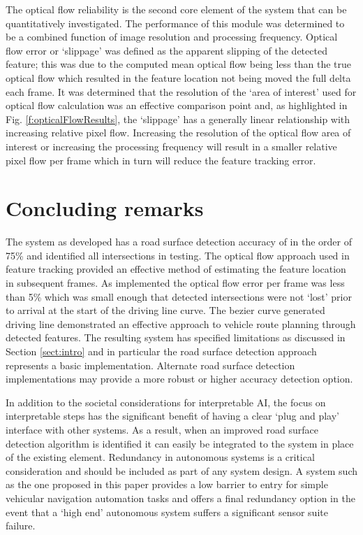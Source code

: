 \documentclass[]{aiaa-tc}%
\begin{document}
The optical flow reliability is the second core element of the system that can be quantitatively investigated. The performance of this module was determined to be a combined function of image resolution and processing frequency. Optical flow error or `slippage' was defined as the apparent slipping of the detected feature; this was due to the computed mean optical flow being less than the true optical flow which resulted in the feature location not being moved the full delta each frame. It was determined that the resolution of the `area of interest' used for optical flow calculation was an effective comparison point and, as highlighted in Fig. \ref{f:opticalFlowResults}, the `slippage' has a generally linear relationship with increasing relative pixel flow. Increasing the resolution of the optical flow area of interest or increasing the processing frequency will result in a smaller relative pixel flow per frame which in turn will reduce the feature tracking error.

\section{Concluding remarks}

The system as developed has a road surface detection accuracy of in the order of 75\% and identified all intersections in testing. The optical flow approach used in feature tracking provided an effective method of estimating the feature location in subsequent frames. As implemented the optical flow error per frame was less than 5\% which was small enough that detected intersections were not `lost' prior to arrival at the start of the driving line curve. The bezier curve generated driving line demonstrated an effective approach to vehicle route planning through detected features. The resulting system has specified limitations as discussed in Section \ref{sect:intro} and in particular the road surface detection approach represents a basic implementation. Alternate road surface detection implementations may provide a more robust or higher accuracy detection option.

In addition to the societal considerations for interpretable AI, the focus on interpretable steps has the significant benefit of having a clear `plug and play' interface with other systems. As a result, when an improved road surface detection algorithm is identified it can easily be integrated to the system in place of the existing element. Redundancy in autonomous systems is a critical consideration and should be included as part of any system design. A system such as the one proposed in this paper provides a low barrier to entry for simple vehicular navigation automation tasks and offers a final redundancy option in the event that a `high end' autonomous system suffers a significant sensor suite failure.
\end{document}
